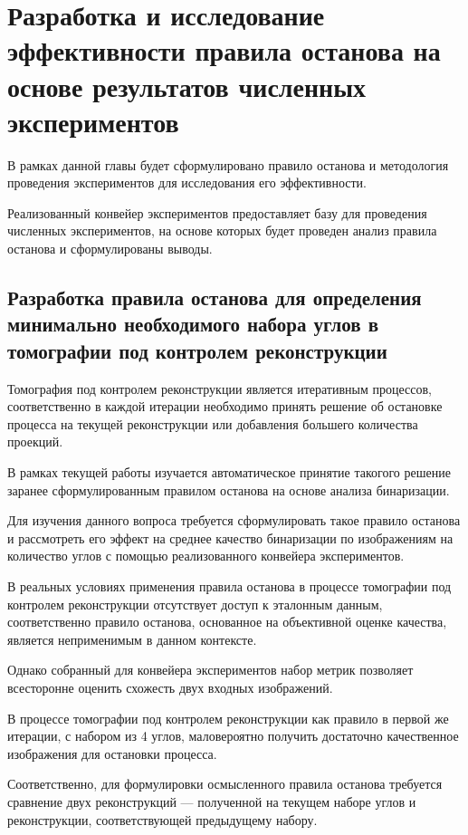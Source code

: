 \section{Разработка и исследование эффективности правила останова на основе результатов численных экспериментов}

В рамках данной главы будет сформулировано правило останова и методология проведения экспериментов для исследования его эффективности.

Реализованный конвейер экспериментов предоставляет базу для проведения численных экспериментов, на основе которых будет проведен анализ правила останова и сформулированы выводы.

\subsection{Разработка правила останова для определения минимально необходимого набора углов в томографии под контролем реконструкции}

Томография под контролем реконструкции является итеративным процессов, соответственно в каждой итерации необходимо принять решение об остановке процесса на текущей реконструкции или добавления большего количества проекций.

В рамках текущей работы изучается автоматическое принятие такогого решение заранее сформулированным правилом останова на основе анализа бинаризации.

Для изучения данного вопроса требуется сформулировать такое правило останова и рассмотреть его эффект на среднее качество бинаризации по изображениям на количество углов с помощью реализованного конвейера экспериментов.

В реальных условиях применения правила останова в процессе томографии под контролем реконструкции отсутствует доступ к эталонным данным, соответственно правило останова, основанное на объективной оценке качества, является неприменимым в данном контексте.

Однако собранный для конвейера экспериментов набор метрик позволяет всесторонне оценить схожесть двух входных изображений.

В процессе томографии под контролем реконструкции как правило в первой же итерации, с набором из 4 углов, маловероятно получить достаточно качественное изображения для остановки процесса. 

Соответственно, для формулировки осмысленного правила останова требуется сравнение двух реконструкций — полученной на текущем наборе углов и реконструкции, соответствующей предыдущему набору. 


